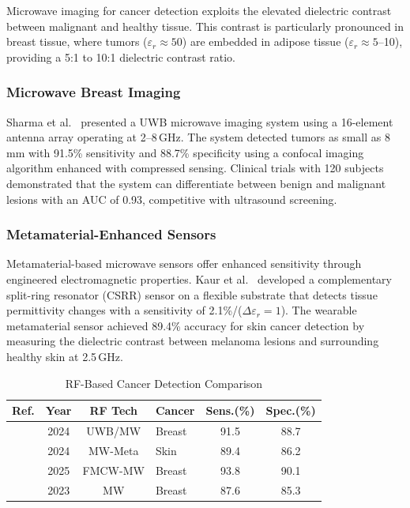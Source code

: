 \documentclass[journal,twoside]{IEEEtran}
\begin{document}
Microwave imaging for cancer detection exploits the elevated dielectric contrast between malignant and healthy tissue. This contrast is particularly pronounced in breast tissue, where tumors ($\varepsilon_r \approx 50$) are embedded in adipose tissue ($\varepsilon_r \approx 5$--10), providing a 5:1 to 10:1 dielectric contrast ratio.

\subsubsection{Microwave Breast Imaging}
Sharma et al.~\cite{ref_uwb_breast2024} presented a UWB microwave imaging system using a 16-element antenna array operating at 2--8\,GHz. The system detected tumors as small as 8\,mm with 91.5\% sensitivity and 88.7\% specificity using a confocal imaging algorithm enhanced with compressed sensing. Clinical trials with 120 subjects demonstrated that the system can differentiate between benign and malignant lesions with an AUC of 0.93, competitive with ultrasound screening.

\subsubsection{Metamaterial-Enhanced Sensors}
Metamaterial-based microwave sensors offer enhanced sensitivity through engineered electromagnetic properties. Kaur et al.~\cite{ref_metamaterial_cancer2024} developed a complementary split-ring resonator (CSRR) sensor on a flexible substrate that detects tissue permittivity changes with a sensitivity of 2.1\%/($\Delta\varepsilon_r = 1$). The wearable metamaterial sensor achieved 89.4\% accuracy for skin cancer detection by measuring the dielectric contrast between melanoma lesions and surrounding healthy skin at 2.5\,GHz.

\begin{table}[!t]
\centering
\caption{RF-Based Cancer Detection Comparison}
\label{tab:cancer}
\footnotesize
\setlength{\tabcolsep}{2.5pt}
\begin{tabular}{@{}L{1.2cm} c c L{1.2cm} c c@{}}
\toprule
\textbf{Ref.} & \textbf{Year} & \textbf{RF Tech} & \textbf{Cancer} & \textbf{Sens.(\%)} & \textbf{Spec.(\%)} \\
\midrule
\cite{ref_uwb_breast2024} & 2024 & UWB/MW & Breast & 91.5 & 88.7 \\
\cite{ref_metamaterial_cancer2024} & 2024 & MW-Meta & Skin & 89.4 & 86.2 \\
\cite{ref_breast_radar2025} & 2025 & FMCW-MW & Breast & 93.8 & 90.1 \\
\cite{ref_cancer_ml2023} & 2023 & MW & Breast & 87.6 & 85.3 \\
\bottomrule
\end{tabular}
\end{table}
\end{document}
